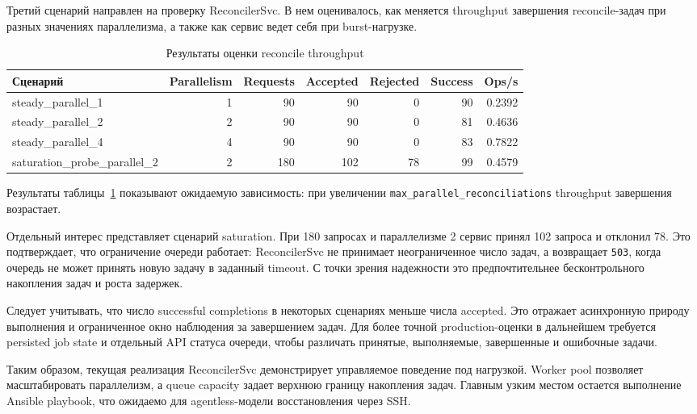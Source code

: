 Третий сценарий направлен на проверку ReconcilerSvc. В нем оценивалось, как меняется throughput завершения reconcile-задач при разных значениях параллелизма, а также как сервис ведет себя при burst-нагрузке.

\begin{table}
    \centering
    \caption{Результаты оценки reconcile throughput}
    \label{tab:ch4-reconcile-throughput}
    \footnotesize
    \begin{tabular}{|p{}|r|r|r|r|r|r|}\hline
    Сценарий & Parallelism & Requests & Accepted & Rejected & Success & Ops/s \\ \hline
    steady\_parallel\_1 & 1 & 90  & 90  & 0  & 90 & 0.2392 \\ \hline
    steady\_parallel\_2 & 2 & 90  & 90  & 0  & 81 & 0.4636 \\ \hline
    steady\_parallel\_4 & 4 & 90  & 90  & 0  & 83 & 0.7822 \\ \hline
    saturation\_probe\_parallel\_2 & 2 & 180 & 102 & 78 & 99 & 0.4579 \\ \hline
    \end{tabular}
    \normalsize
\end{table}

Результаты таблицы~\ref{tab:ch4-reconcile-throughput} показывают ожидаемую зависимость: при увеличении \texttt{max\_parallel\_reconciliations} throughput завершения возрастает.

Отдельный интерес представляет сценарий saturation. При 180 запросах и параллелизме 2 сервис принял 102 запроса и отклонил 78. Это подтверждает, что ограничение очереди работает: ReconcilerSvc не принимает неограниченное число задач, а возвращает \texttt{503}, когда очередь не может принять новую задачу в заданный timeout. С точки зрения надежности это предпочтительнее бесконтрольного накопления задач и роста задержек.

Следует учитывать, что число successful completions в некоторых сценариях меньше числа accepted. Это отражает асинхронную природу выполнения и ограниченное окно наблюдения за завершением задач. Для более точной production-оценки в дальнейшем требуется persisted job state и отдельный API статуса очереди, чтобы различать принятые, выполняемые, завершенные и ошибочные задачи.

Таким образом, текущая реализация ReconcilerSvc демонстрирует управляемое поведение под нагрузкой. Worker pool позволяет масштабировать параллелизм, а queue capacity задает верхнюю границу накопления задач. Главным узким местом остается выполнение Ansible playbook, что ожидаемо для agentless-модели восстановления через SSH.

